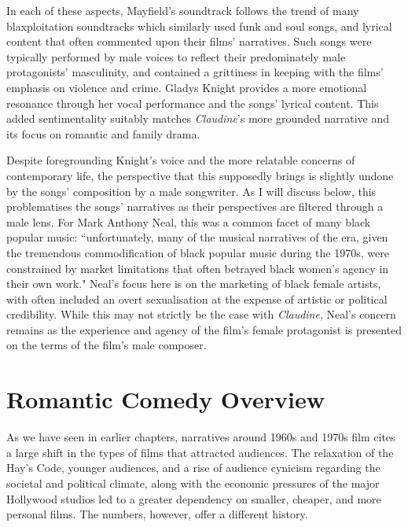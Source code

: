 In each of these aspects, Mayfield's soundtrack follows the trend of many blaxploitation soundtracks which similarly used funk and soul songs, and lyrical content that often commented upon their films' narratives.
Such songs were typically performed by male voices to reflect their predominately male protagonists' masculinity, and contained a grittiness in keeping with the films' emphasis on violence and crime.
Gladys Knight provides a more emotional resonance through her vocal performance and the songs' lyrical content.
This added sentimentality suitably matches \textit{Claudine}'s more grounded narrative and its focus on romantic and family drama.

Despite foregrounding Knight's voice and the more relatable concerns of contemporary life, the perspective that this supposedly brings is slightly undone by the songs' composition by a male songwriter.
As I will discuss below, this problematises the songs' narratives as their perspectives are filtered through a male lens.
For Mark Anthony Neal, this was a common facet of many black popular music:
``unfortunately, many of the musical narratives of the era, given the tremendous commodification of black popular music during the 1970s, were constrained by market limitations that often betrayed black women's agency in their own work."\autocite[][76-77]{neal_what_1999}
Neal's focus here is on the marketing of black female artists, with often included an overt sexualisation at the expense of artistic or political credibility.
While this may not strictly be the case with \textit{Claudine}, Neal's concern remains as the experience and agency of the film's female protagonist is presented on the terms of the film's male composer.



\section{Romantic Comedy Overview}

As we have seen in earlier chapters, narratives around 1960s and 1970s film cites a large shift in the types of films that attracted audiences.
The relaxation of the Hay’s Code, younger audiences, and a rise of audience cynicism regarding the societal and political climate, along with the economic pressures of the major Hollywood studios led to a greater dependency on smaller, cheaper, and more personal films.
The numbers, however, offer a different history.

